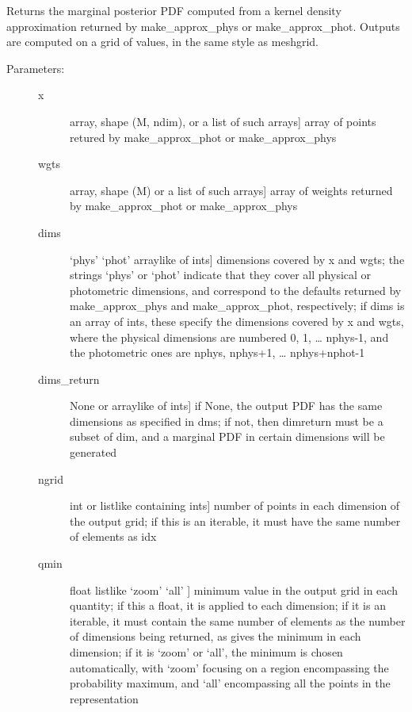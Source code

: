 \documentclass[letterpaper,10pt,english]{sphinxmanual}
\begin{document}
\begin{fulllineitems}
\begin{fulllineitems}
\end{fulllineitems}


\begin{fulllineitems}
\label{\detokenize{bayesphot:slugpy.bayesphot.bp.bp.mpdf_approx}}
Returns the marginal posterior PDF computed from a kernel
density approximation returned by make\_approx\_phys or
make\_approx\_phot. Outputs are computed on a grid of values, in
the same style as meshgrid.
\begin{description}
\item[{Parameters:}] \leavevmode\begin{description}
\item[{x}] \leavevmode{[}array, shape (M, ndim), or a list of such arrays{]}
array of points retured by make\_approx\_phot or
make\_approx\_phys

\item[{wgts}] \leavevmode{[}array, shape (M) or a list of such arrays{]}
array of weights returned by make\_approx\_phot or
make\_approx\_phys

\item[{dims}] \leavevmode{[}‘phys’ \textbar{} ‘phot’ \textbar{} arraylike of ints{]}
dimensions covered by x and wgts; the strings ‘phys’ or
‘phot’ indicate that they cover all physical or
photometric dimensions, and correspond to the defaults
returned by make\_approx\_phys and make\_approx\_phot,
respectively; if dims is an array of ints, these specify
the dimensions covered by x and wgts, where the
physical dimensions are numbered 0, 1, … nphys-1, and
the photometric ones are nphys, nphys+1,
… nphys+nphot-1

\item[{dims\_return}] \leavevmode{[}None or arraylike of ints{]}
if None, the output PDF has the same dimensions as
specified in dms; if not, then dimreturn must be a
subset of dim, and a marginal PDF in certain dimensions
will be generated

\item[{ngrid}] \leavevmode{[}int or listlike containing ints{]}
number of points in each dimension of the output grid;
if this is an iterable, it must have the same number of
elements as idx

\item[{qmin}] \leavevmode{[}float \textbar{} listlike \textbar{} ‘zoom’ \textbar{} ‘all’ {]}
minimum value in the output grid in each quantity; if
this a float, it is applied to each dimension; if it is
an iterable, it must contain the same number of elements
as the number of dimensions being returned, as gives the
minimum in each dimension; if it is ‘zoom’ or ‘all’, the
minimum is chosen automatically, with ‘zoom’ focusing on
a region encompassing the probability maximum, and ‘all’
encompassing all the points in the representation


\end{description}
\end{description}
\end{fulllineitems}
\end{fulllineitems}
\end{document}
